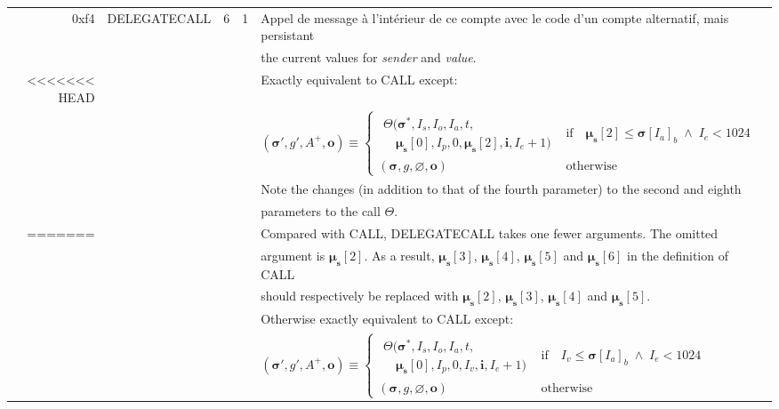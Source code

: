 \documentclass[9pt,oneside]{amsart}
\begin{document}
\begin{tabular*}{\columnwidth}[h]{rlrrl}
\midrule
0xf4 & {\small DELEGATECALL} & 6 & 1 & Appel de message à l'intérieur de ce compte avec le code d'un compte alternatif, mais persistant\\
&&&& the current values for {\it sender} and {\it value}. \\
<<<<<<< HEAD
&&&& Exactly equivalent to {\small CALL} except: \\
&&&& $(\boldsymbol{\sigma}', g', A^+, \mathbf{o}) \equiv \begin{cases}\begin{array}{l}\Theta(\boldsymbol{\sigma}^*, I_s, I_o, I_a, t,\\\quad \boldsymbol{\mu}_\mathbf{s}[0], I_p, 0, \boldsymbol{\mu}_\mathbf{s}[2], \mathbf{i}, I_e + 1)\end{array} & \text{if} \quad \boldsymbol{\mu}_\mathbf{s}[2] \leqslant \boldsymbol{\sigma}[I_a]_b \;\wedge\; I_e < 1024 \\ (\boldsymbol{\sigma}, g, \varnothing, \mathbf{o}) & \text{otherwise} \end{cases}$ \\
&&&& Note the changes (in addition to that of the fourth parameter) to the second and eighth\\
&&&& parameters to the call $\Theta$.\\
=======
&&&& Compared with {\small CALL}, {\small DELEGATECALL} takes one fewer arguments.  The omitted\\
&&&& argument is $\boldsymbol{\mu}_\mathbf{s}[2]$. As a result, $\boldsymbol{\mu}_\mathbf{s}[3]$, $\boldsymbol{\mu}_\mathbf{s}[4]$, $\boldsymbol{\mu}_\mathbf{s}[5]$ and $\boldsymbol{\mu}_\mathbf{s}[6]$ in the definition of {\small CALL} \\
&&&& should respectively be replaced with $\boldsymbol{\mu}_\mathbf{s}[2]$, $\boldsymbol{\mu}_\mathbf{s}[3]$, $\boldsymbol{\mu}_\mathbf{s}[4]$ and $\boldsymbol{\mu}_\mathbf{s}[5]$. \\
&&&& Otherwise exactly equivalent to {\small CALL} except: \\
&&&& $(\boldsymbol{\sigma}', g', A^+, \mathbf{o}) \equiv \begin{cases}\begin{array}{l}\Theta(\boldsymbol{\sigma}^*, I_s, I_o, I_a, t,\\\quad \boldsymbol{\mu}_\mathbf{s}[0], I_p, 0, I_v, \mathbf{i}, I_e + 1)\end{array} & \text{if} \quad I_v \leqslant \boldsymbol{\sigma}[I_a]_b \;\wedge\; I_e < 1024 \\ (\boldsymbol{\sigma}, g, \varnothing, \mathbf{o}) & \text{otherwise} \end{cases}$ \\

\end{tabular*}
\end{document}
